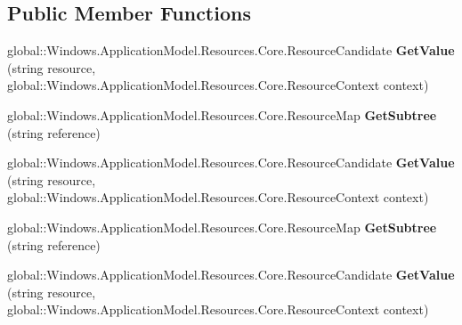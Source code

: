 \subsection*{Public Member Functions}
\begin{DoxyCompactItemize}
\item 
\mbox{\label{interface_windows_1_1_application_model_1_1_resources_1_1_core_1_1_i_resource_map_a10c5402ab664421631fa20105c6ea848}} 
global\+::\+Windows.\+Application\+Model.\+Resources.\+Core.\+Resource\+Candidate {\bfseries Get\+Value} (string resource, global\+::\+Windows.\+Application\+Model.\+Resources.\+Core.\+Resource\+Context context)
\item 
\mbox{\label{interface_windows_1_1_application_model_1_1_resources_1_1_core_1_1_i_resource_map_a7f6ac609da4239d24df7485f1181c2a6}} 
global\+::\+Windows.\+Application\+Model.\+Resources.\+Core.\+Resource\+Map {\bfseries Get\+Subtree} (string reference)
\item 
\mbox{\label{interface_windows_1_1_application_model_1_1_resources_1_1_core_1_1_i_resource_map_a10c5402ab664421631fa20105c6ea848}} 
global\+::\+Windows.\+Application\+Model.\+Resources.\+Core.\+Resource\+Candidate {\bfseries Get\+Value} (string resource, global\+::\+Windows.\+Application\+Model.\+Resources.\+Core.\+Resource\+Context context)
\item 
\mbox{\label{interface_windows_1_1_application_model_1_1_resources_1_1_core_1_1_i_resource_map_a7f6ac609da4239d24df7485f1181c2a6}} 
global\+::\+Windows.\+Application\+Model.\+Resources.\+Core.\+Resource\+Map {\bfseries Get\+Subtree} (string reference)
\item 
\mbox{\label{interface_windows_1_1_application_model_1_1_resources_1_1_core_1_1_i_resource_map_a10c5402ab664421631fa20105c6ea848}} 
global\+::\+Windows.\+Application\+Model.\+Resources.\+Core.\+Resource\+Candidate {\bfseries Get\+Value} (string resource, global\+::\+Windows.\+Application\+Model.\+Resources.\+Core.\+Resource\+Context context)

\end{DoxyCompactItemize}
